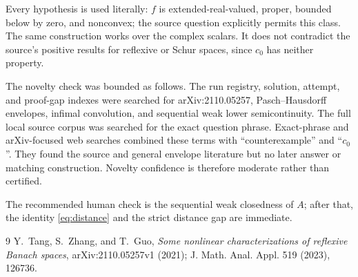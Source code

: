 \documentclass[11pt]{article}
\begin{document}
Every hypothesis is used literally: $f$ is extended-real-valued, proper,
bounded below by zero, and nonconvex; the source question explicitly permits
this class.  The same construction works over the complex scalars.  It does
not contradict the source's positive results for reflexive or Schur spaces,
since $c_0$ has neither property.

The novelty check was bounded as follows.  The run registry, solution,
attempt, and proof-gap indexes were searched for arXiv:2110.05257,
Pasch--Hausdorff envelopes, infimal convolution, and sequential weak lower
semicontinuity.  The full local source corpus was searched for the exact
question phrase.  Exact-phrase and arXiv-focused web searches combined these
terms with ``counterexample'' and ``$c_0$''.  They found the source and general
envelope literature but no later answer or matching construction.  Novelty
confidence is therefore moderate rather than certified.

The recommended human check is the sequential weak closedness of $A$; after
that, the identity \eqref{eq:distance} and the strict distance gap are
immediate.

\begin{thebibliography}{9}
Y.~Tang, S.~Zhang, and T.~Guo,
\emph{Some nonlinear characterizations of reflexive Banach spaces},
arXiv:2110.05257v1 (2021); J. Math. Anal. Appl. 519 (2023), 126736.
\end{thebibliography}
\end{document}
